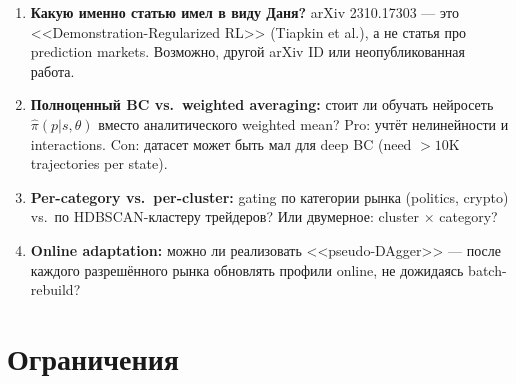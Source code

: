\begin{enumerate}
  \item \textbf{Какую именно статью имел в виду Даня?}
    arXiv 2310.17303 --- это <<Demonstration-Regularized RL>> (Tiapkin et al.),
    а не статья про prediction markets.
    Возможно, другой arXiv ID или неопубликованная работа.

  \item \textbf{Полноценный BC vs.\ weighted averaging:}
    стоит ли обучать нейросеть $\hat{\pi}(p|s, \theta)$
    вместо аналитического weighted mean?
    Pro: учтёт нелинейности и interactions.
    Con: датасет может быть мал для deep BC (need $>10$K trajectories per state).

  \item \textbf{Per-category vs.\ per-cluster:}
    gating по категории рынка (politics, crypto) vs.\ по HDBSCAN-кластеру трейдеров?
    Или двумерное: cluster $\times$ category?

  \item \textbf{Online adaptation:}
    можно ли реализовать <<pseudo-DAgger>> ---
    после каждого разрешённого рынка обновлять профили online,
    не дожидаясь batch-rebuild?
\end{enumerate}

\section{Ограничения}
\label{sec:limitations}

